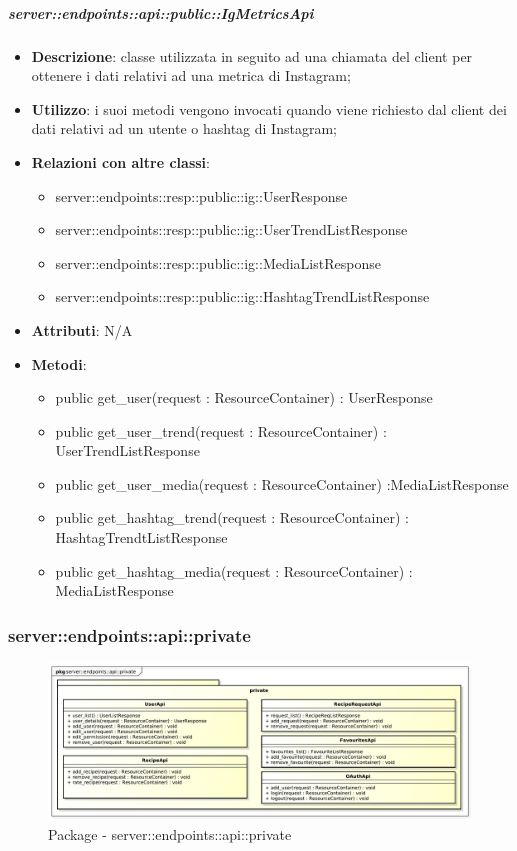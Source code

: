     \subparagraph{server::endpoints::api::public::IgMetricsApi} %
    \label{subp:bdsm_app_server_endpoints_api_public_igmetricsapi}
    \begin{itemize}
      \item \textbf{Descrizione}: classe utilizzata in seguito ad una chiamata del client per ottenere i dati relativi ad una metrica di Instagram;
      \item \textbf{Utilizzo}: i suoi metodi vengono invocati quando viene richiesto dal client dei dati relativi ad un utente o hashtag di Instagram;
      \item \textbf{Relazioni con altre classi}:
        \begin{itemize}
          \item server::endpoints::resp::public::ig::UserResponse
          \item server::endpoints::resp::public::ig::UserTrendListResponse
          \item server::endpoints::resp::public::ig::MediaListResponse
          \item server::endpoints::resp::public::ig::HashtagTrendListResponse
        \end{itemize}
		\item \textbf{Attributi}: N/A
		\item \textbf{Metodi}:   
			\begin{itemize}
				\item public get\_user(request : ResourceContainer) : UserResponse
				\item public get\_user\_trend(request : ResourceContainer) : UserTrendListResponse
				\item public get\_user\_media(request : ResourceContainer) :MediaListResponse
				\item public get\_hashtag\_trend(request : ResourceContainer) : HashtagTrendtListResponse
				\item public get\_hashtag\_media(request : ResourceContainer) : MediaListResponse
			\end{itemize}
      \end{itemize}

\subsubsection{server::endpoints::api::private} %
\label{ssub:bdsm_app_server_endpoints_api_private}
\begin{figure}[!htbp]
	\centering
	\centerline{\includegraphics[scale=0.4]{./images/server/api_private.pdf}}
	\caption{Package - server::endpoints::api::private}
\end{figure}

